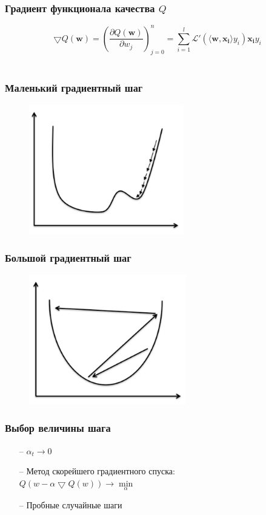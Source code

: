\documentclass[10pt]{beamer}
\begin{document}
\begin{frame}\frametitle{Градиент функционала качества $Q$}
	$$\bigtriangledown Q(\mathbf{w}) = \left(\frac{\partial Q(\mathbf{w})}{\partial w_j}\right)_{j=0}^n = \sum\limits_{i=1}^l \mathcal{L}'(\langle \mathbf{w}, \mathbf{x_i} \rangle y_i) \mathbf{x_i} y_i$$\\
\end{frame}

\begin{frame}\frametitle{Маленький градиентный шаг}
	\begin{figure}[htbp]
	  \includegraphics[height=160pt, keepaspectratio = true]{images/learning_rate_small}
	\end{figure}
\end{frame}

\begin{frame}\frametitle{Большой градиентный шаг}
	\begin{figure}[htbp]
	  \includegraphics[height=160pt, keepaspectratio = true]{images/learning_rate_large}
	\end{figure}
\end{frame}

\begin{frame}\frametitle{Выбор величины шага}
	\begin{itemize}
		\item[--] $\alpha_t \rightarrow 0$\\
		\item[--] Метод скорейшего градиентного спуска:\\
		$Q(w - \alpha \bigtriangledown Q(w)) \rightarrow \min\limits_{\alpha}$
		\item[--] Пробные случайные шаги
	\end{itemize}
\end{frame}
\end{document}

